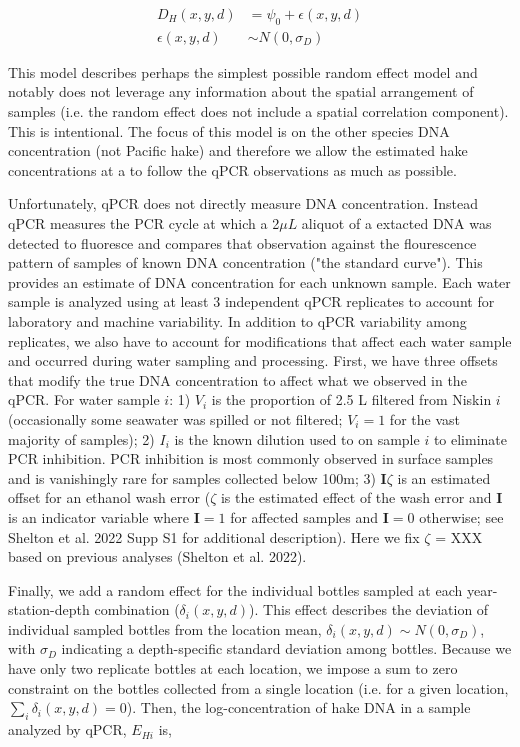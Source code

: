 \documentclass{article}
\begin{document}
\begin{align}
  D_H(x,y,d) &= \psi_0 + \epsilon(x,y,d) \\
  \epsilon(x,y,d) &\sim N(0,\sigma_D)
\end{align}

This model describes perhaps the simplest possible random effect model and notably does not leverage any information about the spatial arrangement of samples (i.e. the random effect does not include a spatial correlation component).  This is intentional.  The focus of this model is on the other species DNA concentration (not Pacific hake) and therefore we allow the estimated hake concentrations at a to follow the qPCR observations as much as possible. 

Unfortunately, qPCR does not directly measure DNA concentration. Instead qPCR measures the PCR cycle at which a 2$\mu L$ aliquot of a extacted DNA was detected to fluoresce and compares that observation against the flourescence pattern of samples of known DNA concentration ("the standard curve"). This provides an estimate of DNA concentration for each unknown sample. Each water sample is analyzed using at least 3 independent qPCR replicates to account for laboratory and machine variability. In addition to qPCR variability among replicates, we also have to account for modifications that affect each water sample and occurred during water sampling and processing. First, we have three offsets that modify the true DNA concentration to affect what we observed in the qPCR. For water sample $i$: 1) $V_i$ is the proportion of 2.5 L filtered from Niskin $i$ (occasionally some seawater was spilled or not filtered; $V_i =1$ for the vast majority of samples); 2) $I_i$ is the known dilution used to on sample $i$ to eliminate PCR inhibition. PCR inhibition is most commonly observed in surface samples and is vanishingly rare for samples collected below 100m; 3) $\mathbf{I}\zeta$ is an estimated offset for an ethanol wash error ($\zeta$ is the estimated effect of the wash error and $\mathbf{I}$ is an indicator variable where $\mathbf{I}=1$ for affected samples and $\mathbf{I}=0$ otherwise; see Shelton et al. 2022 Supp S1 for additional description). Here we fix $\zeta$ = XXX based on previous analyses (Shelton et al. 2022).

Finally, we add a random effect for the individual bottles sampled at each year-station-depth combination ($\delta_i(x,y,d)$). This effect  describes the deviation of individual sampled bottles from the location mean, $\delta_i(x,y,d) \sim N(0,\sigma_D)$, with $\sigma_D$ indicating a depth-specific standard deviation among bottles. Because we have only two replicate bottles at each location, we impose a sum to zero constraint on the bottles collected from a single location (i.e. for a given location, $\sum_i \delta_i(x,y,d) = 0$). Then, the log-concentration of hake DNA in a sample analyzed by qPCR, $E_{Hi}$ is, 
\end{document}
